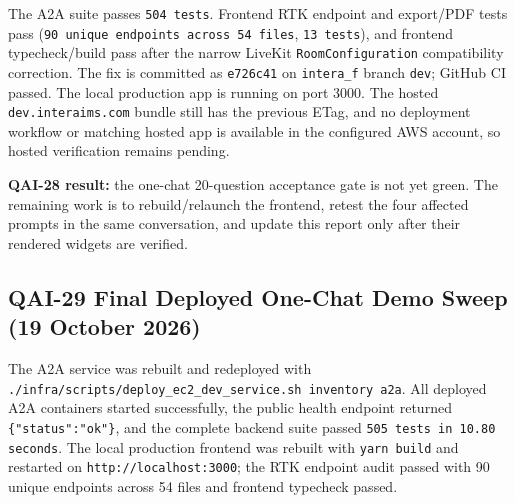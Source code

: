 \documentclass[10pt]{article}
\begin{document}
The A2A suite passes \texttt{504 tests}. Frontend RTK endpoint and export/PDF tests pass (\texttt{90 unique endpoints across 54 files}, \texttt{13 tests}), and frontend typecheck/build pass after the narrow LiveKit \texttt{RoomConfiguration} compatibility correction. The fix is committed as \texttt{e726c41} on \texttt{intera\_f} branch \texttt{dev}; GitHub CI passed. The local production app is running on port 3000. The hosted \texttt{dev.interaims.com} bundle still has the previous ETag, and no deployment workflow or matching hosted app is available in the configured AWS account, so hosted verification remains pending.

\textbf{QAI-28 result:} the one-chat 20-question acceptance gate is not yet green. The remaining work is to rebuild/relaunch the frontend, retest the four affected prompts in the same conversation, and update this report only after their rendered widgets are verified.

\subsection{QAI-29 Final Deployed One-Chat Demo Sweep (19 October 2026)}
The A2A service was rebuilt and redeployed with \texttt{./infra/scripts/deploy\_ec2\_dev\_service.sh inventory a2a}. All deployed A2A containers started successfully, the public health endpoint returned \texttt{\{"status":"ok"\}}, and the complete backend suite passed \texttt{505 tests in 10.80 seconds}. The local production frontend was rebuilt with \texttt{yarn build} and restarted on \texttt{http://localhost:3000}; the RTK endpoint audit passed with 90 unique endpoints across 54 files and frontend typecheck passed.
\end{document}
